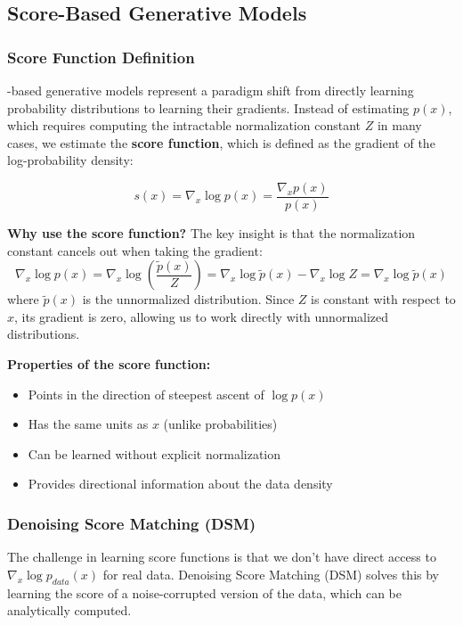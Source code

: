 \documentclass[journal]{IEEEtran}
\begin{document}
\subsection{Score-Based Generative Models}

\subsubsection{Score Function Definition}
-based generative models represent a paradigm shift from directly learning probability distributions to learning their gradients. Instead of estimating $p(x)$, which requires computing the intractable normalization constant $Z$ in many cases, we estimate the \textbf{score function}, which is defined as the gradient of the log-probability density:

\begin{equation}
s(x) = \nabla_x \log p(x) = \frac{\nabla_x p(x)}{p(x)}
\end{equation}

\textbf{Why use the score function?} The key insight is that the normalization constant cancels out when taking the gradient:
\begin{equation}
\nabla_x \log p(x) = \nabla_x \log \left(\frac{\tilde{p}(x)}{Z}\right) = \nabla_x \log \tilde{p}(x) - \nabla_x \log Z = \nabla_x \log \tilde{p}(x)
\end{equation}
where $\tilde{p}(x)$ is the unnormalized distribution. Since $Z$ is constant with respect to $x$, its gradient is zero, allowing us to work directly with unnormalized distributions.

\textbf{Properties of the score function:}
\begin{itemize}
    \item Points in the direction of steepest ascent of $\log p(x)$
    \item Has the same units as $x$ (unlike probabilities)
    \item Can be learned without explicit normalization
    \item Provides directional information about the data density
\end{itemize}

\subsubsection{Denoising Score Matching (DSM)}

The challenge in learning score functions is that we don't have direct access to $\nabla_x \log p_{data}(x)$ for real data. Denoising Score Matching (DSM) solves this by learning the score of a noise-corrupted version of the data, which can be analytically computed.
\end{document}
